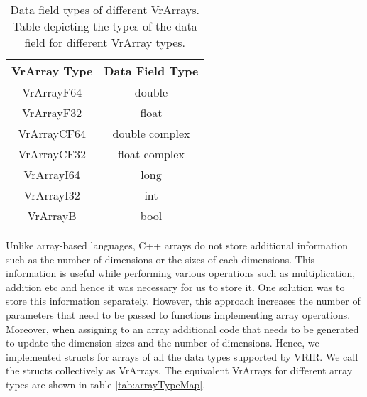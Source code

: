 \begin{table}[htbp]
\centering
\begin{tabular}{|c|c|}
\hline
VrArray Type & Data Field Type \\ \hline
VrArrayF64   & double          \\ \hline
VrArrayF32   & float           \\ \hline
VrArrayCF64  & double complex  \\ \hline
VrArrayCF32  & float complex  \\ \hline
VrArrayI64   & long            \\ \hline
VrArrayI32   & int             \\ \hline
VrArrayB     & bool            \\ \hline
\end{tabular}
\caption[Data field types of different VrArrays]{Data field types of different VrArrays. Table depicting the types of the data field for different VrArray types.}
\label{tab:arrayDataMap}
\end{table}
Unlike array-based languages, C++ arrays do not store additional information such as the number of dimensions or the sizes of each dimensions. This information is useful while performing various operations such as multiplication, addition etc and hence it was necessary for us to store it. One solution was to store this information separately. However, this approach increases the number of parameters that need to be passed to functions implementing array operations. Moreover, when assigning to an array additional code that needs to be generated to update the dimension sizes and the number of dimensions. Hence, we implemented structs for arrays of all the data types supported by VRIR. We call the structs collectively as VrArrays. The equivalent VrArrays for different array types are shown in table \ref{tab:arrayTypeMap}.
